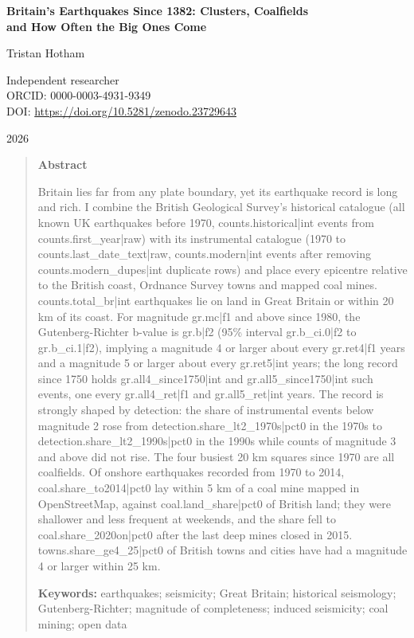 \documentclass[11pt,a4paper]{article}
\begin{document}
\begin{center}
{\Large\bfseries Britain's Earthquakes Since 1382: Clusters, Coalfields\\[2pt] and How Often the Big Ones Come\par}
\vspace{1.2em}
{\large Tristan Hotham\par}
\vspace{0.3em}
{\small Independent researcher\\
ORCID: 0000-0003-4931-9349\\
DOI: \href{https://doi.org/10.5281/zenodo.23729643}{https://doi.org/10.5281/zenodo.23729643}\par}
\vspace{0.8em}
2026
\end{center}

\begin{quote}
\small
\begin{center}\textbf{Abstract}\end{center}
Britain lies far from any plate boundary, yet its earthquake record is long and rich. I combine the British Geological Survey's historical catalogue (all known UK earthquakes before 1970, {{counts.historical|int}} events from {{counts.first_year|raw}}) with its instrumental catalogue (1970 to {{counts.last_date_text|raw}}, {{counts.modern|int}} events after removing {{counts.modern_dupes|int}} duplicate rows) and place every epicentre relative to the British coast, Ordnance Survey towns and mapped coal mines. {{counts.total_br|int}} earthquakes lie on land in Great Britain or within 20 km of its coast. For magnitude {{gr.mc|f1}} and above since 1980, the Gutenberg-Richter b-value is {{gr.b|f2}} (95\% interval {{gr.b_ci.0|f2}} to {{gr.b_ci.1|f2}}), implying a magnitude 4 or larger about every {{gr.ret4|f1}} years and a magnitude 5 or larger about every {{gr.ret5|int}} years; the long record since 1750 holds {{gr.all4_since1750|int}} and {{gr.all5_since1750|int}} such events, one every {{gr.all4_ret|f1}} and {{gr.all5_ret|int}} years. The record is strongly shaped by detection: the share of instrumental events below magnitude 2 rose from {{detection.share_lt2_1970s|pct0}} in the 1970s to {{detection.share_lt2_1990s|pct0}} in the 1990s while counts of magnitude 3 and above did not rise. The four busiest 20 km squares since 1970 are all coalfields. Of onshore earthquakes recorded from 1970 to 2014, {{coal.share_to2014|pct0}} lay within 5 km of a coal mine mapped in OpenStreetMap, against {{coal.land_share|pct0}} of British land; they were shallower and less frequent at weekends, and the share fell to {{coal.share_2020on|pct0}} after the last deep mines closed in 2015. {{towns.share_ge4_25|pct0}} of British towns and cities have had a magnitude 4 or larger within 25 km.

\textbf{Keywords:} earthquakes; seismicity; Great Britain; historical seismology; Gutenberg-Richter; magnitude of completeness; induced seismicity; coal mining; open data
\end{quote}
\end{document}
